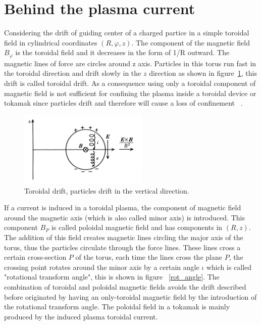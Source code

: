 \section{Behind the plasma current}

Considering the drift of guiding center of a charged partice in a simple toroidal field in cylindrical coordinates $(R,\varphi,z)$. The component of the magnetic field $B_\varphi$ is the toroidal field and it decreases in the form of 1/R outward. The magnetic lines of force are circles around z axis. Particles in this  torus run fast in the toroidal direction and drift slowly in the $z$ direction as shown in figure~\ref{TDrift}, this drift is called toroidal drift. As a consequence  using only a toroidal component of magnetic field is not sufficient for confining the plasma inside a toroidal device or  tokamak  since particles drift and therefore will cause a loss of confinement ~\cite[Chapter~3]{Miyamoto2011}.\smallskip


\begin{figure}
	\centering
	\includegraphics[width=0.55\textwidth]{Chp1/ToroidalDrift.png}
	\caption{Toroidal drift, particles drift in the vertical direction. ~\cite[Chapter~3]{Miyamoto2011} \label{TDrift}}
\end{figure}



If a current is induced in a toroidal plasma, the component of magnetic field around the magnetic axis (which is also called minor axis) is introduced. This component $B_P$ is called poloidal magnetic field and has components in $(R,z)$. The addition of this field creates magnetic lines circling the major axis of the torus, thus the particles circulate through the force lines. These lines cross a certain cross-section $P$ of the torus, each time the lines cross the plane $P$, the crossing point rotates around the minor axis by a certain angle $\iota$ which is called "rotational transform angle", this is shown in figure ~\ref{rot_angle}. The combination of toroidal and poloidal magnetic fields avoids the drift  described before originated by having an only-toroidal magnetic field by the introduction of the  rotational transform angle. The poloidal field in a tokamak is mainly produced by the induced plasma toroidal current.  \smallskip

